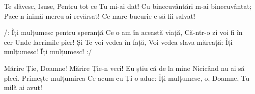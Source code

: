 \beginverse
Te slăvesc, Isuse,
Pentru tot ce Tu mi-ai dat!
Cu binecuvântări m-ai binecuvântat;
Pace-n inimă mereu ai revărsat!
Ce mare bucurie e să fii salvat!
\endverse

\beginchorus
/: Îți mulțumesc pentru speranță
Ce o am în această viață,
Că-ntr-o zi voi fi în cer
Unde lacrimile pier!
Și Te voi vedea în față,
Voi vedea slava măreață:
Îți mulțumesc! Îți mulțumesc! :/
\endchorus

\beginverse
Mărire Ție, Doamne!
Mărire Ție-n veci!
Eu știu că de la mine
Nicicând nu ai să pleci.
Primește mulțumirea
Ce-acum eu Ți-o aduc:
Îți mulțumesc, o, Doamne,
Tu milă ai avut!
\endverse
\endsong